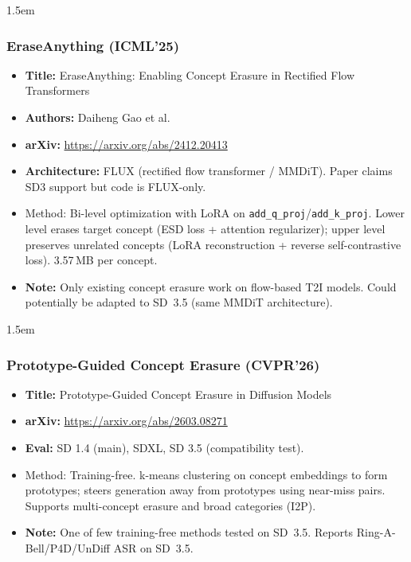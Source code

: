 \documentclass[11pt,a4paper]{article}
\begin{document}
\begin{adjustwidth}{1.5em}{}
\subsubsection{EraseAnything (ICML'25)}

\begin{itemize}
  \item \textbf{Title:} EraseAnything: Enabling Concept Erasure in Rectified Flow Transformers
  \item \textbf{Authors:} Daiheng Gao et al.
  \item \textbf{arXiv:} \url{https://arxiv.org/abs/2412.20413}
  \item \textbf{Architecture:} FLUX (rectified flow transformer / MMDiT). Paper claims SD3 support but code is FLUX-only.
  \item Method: Bi-level optimization with LoRA on \texttt{add\_q\_proj}/\texttt{add\_k\_proj}. Lower level erases target concept (ESD loss + attention regularizer); upper level preserves unrelated concepts (LoRA reconstruction + reverse self-contrastive loss). 3.57\,MB per concept.
  \item \textbf{Note:} Only existing concept erasure work on flow-based T2I models. Could potentially be adapted to SD~3.5 (same MMDiT architecture).
\end{itemize}

\end{adjustwidth}


\begin{adjustwidth}{1.5em}{}
\subsubsection{Prototype-Guided Concept Erasure (CVPR'26)}

\begin{itemize}
  \item \textbf{Title:} Prototype-Guided Concept Erasure in Diffusion Models
  \item \textbf{arXiv:} \url{https://arxiv.org/abs/2603.08271}
  \item \textbf{Eval:} SD 1.4 (main), SDXL, SD 3.5 (compatibility test).
  \item Method: Training-free. k-means clustering on concept embeddings to form prototypes; steers generation away from prototypes using near-miss pairs. Supports multi-concept erasure and broad categories (I2P).
  \item \textbf{Note:} One of few training-free methods tested on SD~3.5. Reports Ring-A-Bell/P4D/UnDiff ASR on SD~3.5.
\end{itemize}

\end{adjustwidth}
\end{document}
